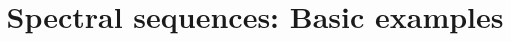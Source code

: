 \documentclass{ximera}
\title{Spectral sequences: Basic examples}
\begin{document}
\begin{abstract}

\end{abstract}
\maketitle

\end{document}
